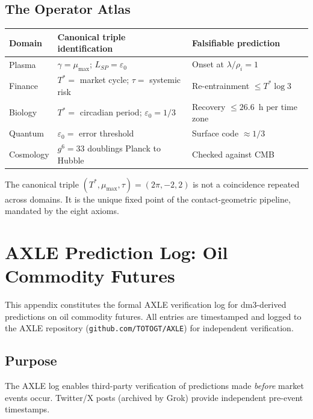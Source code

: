 \documentclass[11pt, twoside, openright]{book}
\theoremstyle{plain}
\theoremstyle{definition}
\newcommand{\eps}{\varepsilon_0}
\begin{document}
\section{The Operator Atlas}

\begin{tabularx}{\textwidth}{@{}P{1.5cm}P{4.5cm}L@{}}
\toprule
\textbf{Domain} & \textbf{Canonical triple identification} &
\textbf{Falsifiable prediction} \\
\midrule
Plasma   & $\gamma = \mu_{\max}$; $L_{SP} = \eps$   &
  Onset at $\lambda/\rho_i = 1$ \\
Finance  & $T^* = $ market cycle; $\tau = $ systemic risk &
  Re-entrainment $\le T^*\log 3$ \\
Biology  & $T^* = $ circadian period; $\eps = 1/3$ &
  Recovery $\le 26.6$~h per time zone \\
Quantum  & $\eps = $ error threshold              &
  Surface code $\approx 1/3$ \\
Cosmology& $g^6 = 33$ doublings Planck to Hubble  &
  Checked against CMB \\
\bottomrule
\end{tabularx}

\medskip
The canonical triple $(T^*, \mu_{\max}, \tau) = (2\pi, -2, 2)$ is not
a coincidence repeated across domains. It is the unique fixed point of
the contact-geometric pipeline, mandated by the eight axioms.

\appendix
\chapter{AXLE Prediction Log: Oil Commodity Futures}
\label{app:axle-oil}

This appendix constitutes the formal AXLE verification log for
dm3-derived predictions on oil commodity futures. All entries are
timestamped and logged to the AXLE repository
(\texttt{github.com/TOTOGT/AXLE}) for independent verification.

\section{Purpose}

The AXLE log enables third-party verification of predictions made
\textit{before} market events occur. Twitter/X posts (archived by Grok)
provide independent pre-event timestamps.
\end{document}
